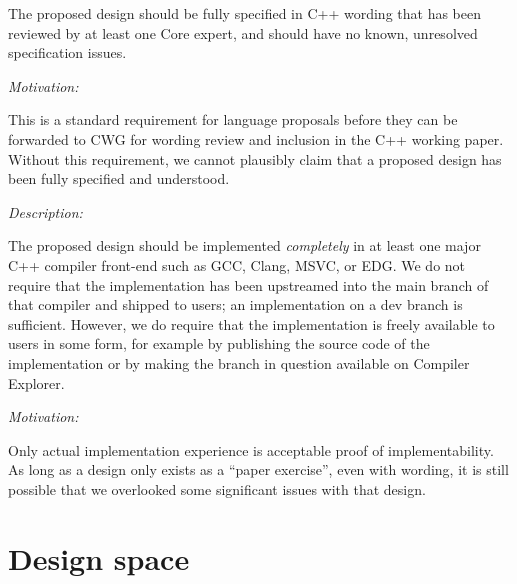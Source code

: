 The proposed design should be fully specified in C++ wording that has been reviewed by at least one Core expert, and should have no known, unresolved specification issues.

\emph{Motivation:}

 This is a standard requirement for language proposals before they can be forwarded to CWG for wording review and inclusion in the C++ working paper.  Without this requirement, we cannot plausibly claim that a proposed design has been fully specified and understood.


\emph{Description:}

The proposed design should be implemented \emph{completely} in at least one major C++ compiler front-end such as GCC, Clang, MSVC, or EDG. We do not require that the implementation has been upstreamed into the main branch of that compiler and shipped to users; an implementation on a dev branch is sufficient. However, we do require that the implementation is freely available to users in some form, for example by publishing the source code of the implementation or by making the branch in question available on Compiler Explorer.

\emph{Motivation:}

Only actual implementation experience is acceptable proof of implementability. As long as a design only exists as a ``paper exercise'', even with wording, it is still possible that we overlooked some significant issues with that design.




\section{Design space}
\label{designs}

